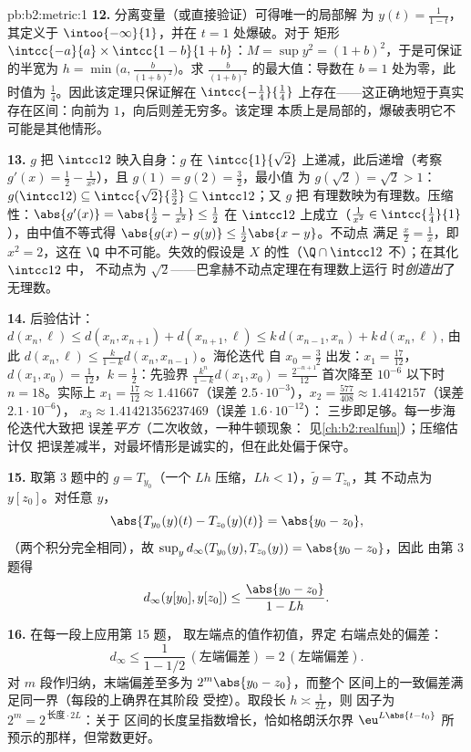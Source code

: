 \begin{solution}{pb:b2:metric:1}
\textbf{12.} 分离变量（或直接验证）可得唯一的局部解
为 $y(t) = \frac1{1 - t}$，其定义于
$\intoo{-\infty}{1}$，并在 $t = 1$ 处爆破。对于
矩形 $\intcc{-a}{a} \times \intcc{1 - b}{1 + b}$：$M =
\sup y^2 = (1 + b)^2$，于是可保证的半宽为 $h =
\min\bigl(a, \frac{b}{(1+b)^2}\bigr)$。求
$\frac{b}{(1+b)^2}$ 的最大值：导数在 $b = 1$ 处为零，此时值为
$\frac14$。因此该定理只保证解在
$\intcc{-\frac14}{\frac14}$ 上存在——这正确地短于真实
存在区间：向前为 $1$，向后则差无穷多。该定理
本质上是局部的，爆破表明它不可能是其他情形。

\textbf{13.} $g$ 把 $\intcc12$ 映入自身：$g$ 在
$\intcc{1}{\sqrt2}$ 上递减，此后递增（考察 $g'(x) = \frac12
- \frac1{x^2}$），且 $g(1) = g(2) = \frac32$，最小值
为 $g(\sqrt2) = \sqrt2 > 1$：$g(\intcc12) \subseteq
\intcc{\sqrt2}{\frac32} \subseteq \intcc12$；又 $g$ 把
有理数映为有理数。压缩性：$\abs{g'(x)} = \abs{\frac12
- \frac1{x^2}} \leq \frac12$ 在 $\intcc12$ 上成立（$\frac1{x^2} \in
\intcc{\frac14}{1}$），由中值不等式得
$\abs{g(x) - g(y)} \leq \frac12\abs{x - y}$。不动点
满足 $\frac x2 = \frac1x$，即 $x^2 = 2$，这在
$\Q$ 中不可能。失效的假设是 $X$ 的性（$\Q \cap
\intcc12$ 不）；在其化 $\intcc12$ 中，
不动点为 $\sqrt2$——巴拿赫不动点定理在有理数上运行
时\emph{创造出}了无理数。

\textbf{14.} 后验估计：$d(x_n, \ell) \leq d(x_n, x_{n+1}) +
d(x_{n+1}, \ell) \leq k\,d(x_{n-1}, x_n) + k\,d(x_n, \ell)$,
由此 $d(x_n, \ell) \leq \frac{k}{1-k}d(x_n, x_{n-1})$。海伦迭代
自 $x_0 = \frac32$ 出发：$x_1 = \frac{17}{12}$，$d(x_1, x_0) =
\frac1{12}$，$k = \frac12$：先验界
$\frac{k^n}{1-k}d(x_1,x_0) = \frac{2^{-n+1}}{12}$ 首次降至
$10^{-6}$ 以下时 $n = 18$。实际上 $x_1 = \frac{17}{12}
\approx 1.41667$（误差 $2.5\cdot10^{-3}$），$x_2 =
\frac{577}{408} \approx 1.4142157$（误差 $2.1\cdot10^{-6}$），
$x_3 \approx 1.41421356237469$（误差 $1.6\cdot10^{-12}$）：
三步即足够。每一步海伦迭代大致把
误差\emph{平方}（二次收敛，一种牛顿现象：
见\cref{ch:b2:realfun}）；压缩估计仅
把误差减半，对最坏情形是诚实的，但在此处偏于保守。

\textbf{15.} 取第 3 题中的 $g = T_{y_0}$（一个
$Lh$ 压缩，$Lh < 1$），$\widetilde g = T_{z_0}$，其
不动点为 $y[z_0]$。对任意 $y$，
\[
\abs{T_{y_0}(y)(t) - T_{z_0}(y)(t)} = \abs{y_0 - z_0},
\]
（两个积分完全相同），故 $\sup_y
d_\infty(T_{y_0}(y), T_{z_0}(y)) = \abs{y_0 - z_0}$，因此
由第 3 题得
\[
d_\infty(y[y_0], y[z_0]) \leq \frac{\abs{y_0 - z_0}}{1 - Lh} .
\]

\textbf{16.} 在每一段上应用第 15 题，
取左端点的值作初值，界定
右端点处的偏差：
\[
d_\infty \leq \frac{1}{1 - 1/2}\,(\text{左端偏差})
= 2\,(\text{左端偏差}) .
\] 对
$m$ 段作归纳，末端偏差至多为
$2^m\abs{y_0 - z_0}$，而整个
区间上的一致偏差满足同一界（每段的上确界在其阶段
受控）。取段长 $h \asymp \frac1{2L}$，则
因子为 $2^m = 2^{\,\text{长度}\cdot 2L}$：关于
区间的长度呈指数增长，恰如格朗沃尔界
$\eu^{L\abs{t-t_0}}$ 所预示的那样，但常数更好。


\end{solution}

